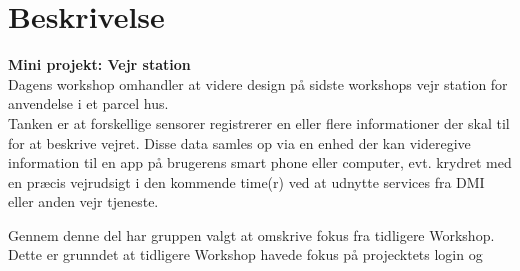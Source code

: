 \documentclass[11pt]{article}
\renewcommand{\baselinestretch}{1.20}
\begin{document}
    
    
    
    \renewcommand{\baselinestretch}{0.8}
    \tableofcontents
    \renewcommand{\baselinestretch}{1.20}
    
    \section{Beskrivelse}
    \textbf{Mini projekt: Vejr station}\\
    Dagens workshop omhandler at videre design på sidste workshops vejr station for anvendelse i et parcel hus. \\
    Tanken er at forskellige sensorer registrerer en eller flere informationer der skal til for at beskrive
    vejret. Disse data samles op via en enhed der kan videregive information til en app på brugerens smart
    phone eller computer, evt. krydret med en præcis vejrudsigt i den kommende time(r) ved at udnytte services fra DMI
    eller anden vejr tjeneste.
    
    Gennem denne del har gruppen valgt at omskrive fokus fra tidligere Workshop. Dette er grunndet at tidligere Workshop havede fokus på projecktets login og 
    
    \newpage
    
    
    \newpage
    
\end{document}
